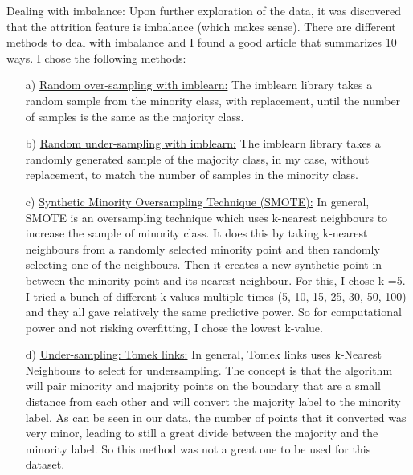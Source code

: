 \documentclass{article}
\begin{document}
Dealing with imbalance: Upon further exploration of the data, it was discovered that the attrition feature is imbalance (which makes sense). There are different methods to deal with imbalance and I found a good article  \cite{imbalance} that summarizes 10 ways. I chose the following methods:
\begin{enumerate}[leftmargin=0.5cm]
\item[a)] \underline{Random over-sampling with imblearn:} The imblearn library takes a random sample from the minority class, with replacement, until the number of samples is the same as the majority class.

\item[b)] \underline{Random under-sampling with imblearn:} The imblearn library takes a randomly generated sample of the majority class, in my case, without replacement, to match the number of samples in the minority class.

\item[c)] \underline{Synthetic Minority Oversampling Technique (SMOTE):} In general, SMOTE is an oversampling technique which uses k-nearest neighbours to increase the sample of minority class. It does this by taking k-nearest neighbours from a randomly selected minority point and then randomly selecting one of the neighbours. Then it creates a new synthetic point in between the minority point and its nearest neighbour. 
For this, I chose k =5. I tried a bunch of different k-values multiple times (5, 10, 15, 25, 30, 50, 100) and they all gave relatively the same predictive power. So for computational power and not risking overfitting, I chose the lowest k-value.

\item[d)] \underline{Under-sampling: Tomek links:} In general, Tomek links uses k-Nearest Neighbours to select for undersampling. The concept is that the algorithm will pair minority and majority points on the boundary that are a small distance from each other and will convert the majority label to the minority label. 
As can be seen in our data, the number of points that it converted was very minor, leading to still a great divide between the majority and the minority label. So this method was not a great one to be used for this dataset.

\end{enumerate}
\end{document}
